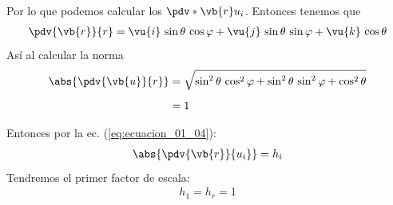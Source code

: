 Por lo que podemos calcular los $\pdv*{\vb{r}}{u_{i}}$. Entonces tenemos que
\begin{align*}
\pdv{\vb{r}}{r} = \vu{i} \, \sin \theta \, \cos \varphi + \vu{j} \, \sin \theta \, \sin \varphi + \vu{k} \, \cos \theta
\end{align*}
Así al calcular la norma
\begin{align*}
\abs{\pdv{\vb{u}}{r}} &= \sqrt{\sin^{2} \theta \, \cos^{2} \varphi + \sin^{2} \theta \, \sin^{2} \varphi + \cos^{2} \theta} \\[0.5em]
&= 1
\end{align*}

Entonces por la ec. (\ref{eq:ecuacion_01_04}):
\begin{align*}
\abs{\pdv{\vb{r}}{u_{i}}} = h_{i}
\end{align*}
Tendremos el primer factor de escala:
\begin{align*}
h_{1} = h_{r} = 1
\end{align*}

